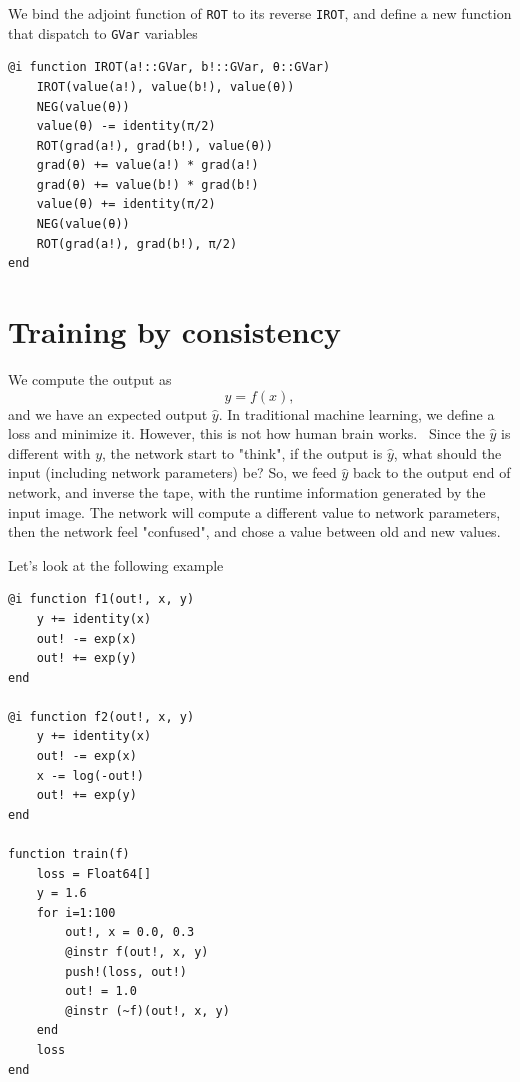 \documentclass[aps,twocolumn,longbibliography,english,superscriptaddress,prr]{revtex4-1}
\newcommand{\<}{\langle}
\renewcommand{\>}{\rangle}
\theoremstyle{definition}\newtheorem{definition}{\textit{Definition}}
\begin{document}
We bind the adjoint function of \texttt{ROT} to its reverse \texttt{IROT},
and define a new function that dispatch to \texttt{GVar} variables

\begin{minipage}{.44\textwidth}
\begin{lstlisting}
@i function IROT(a!::GVar, b!::GVar, θ::GVar)
    IROT(value(a!), value(b!), value(θ))
    NEG(value(θ))
    value(θ) -= identity(π/2)
    ROT(grad(a!), grad(b!), value(θ))
    grad(θ) += value(a!) * grad(a!)
    grad(θ) += value(b!) * grad(b!)
    value(θ) += identity(π/2)
    NEG(value(θ))
    ROT(grad(a!), grad(b!), π/2)
end
\end{lstlisting}
\end{minipage}

\section{Training by consistency}
We compute the output as
\begin{equation}
    y = f(x),
\end{equation}
and we have an expected output $\hat{y}$. In traditional machine learning, we define a loss and minimize it. However, this is not how human brain works.~\cite{Hintoncomment}
Since the $\hat{y}$ is different with $y$, the network start to "think", if the output is $\hat{y}$, what should the input (including network parameters) be?
So, we feed $\hat{y}$ back to the output end of network, and inverse the tape, with the runtime information generated by the input image. The network will compute a different value to network parameters, then the network feel "confused", and chose a value between old and new values.

Let's look at the following example
\begin{minipage}{.44\textwidth}
\begin{lstlisting}[basicstyle=\small\ttfamily,columns=fullflexible]
@i function f1(out!, x, y)
    y += identity(x)
    out! -= exp(x)
    out! += exp(y)
end

@i function f2(out!, x, y)
    y += identity(x)
    out! -= exp(x)
    x -= log(-out!)
    out! += exp(y)
end

function train(f)
    loss = Float64[]
    y = 1.6
    for i=1:100
        out!, x = 0.0, 0.3
        @instr f(out!, x, y)
        push!(loss, out!)
        out! = 1.0
        @instr (~f)(out!, x, y)
    end
    loss
end
\end{lstlisting}
\end{minipage}
\end{document}
